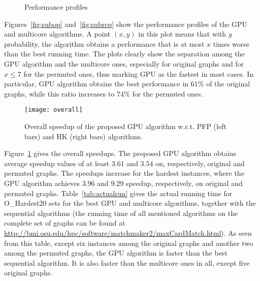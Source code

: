 \documentclass[11pt,a4paper]{article}
\newcommand{\supplementary} {\url{http://bmi.osu.edu/hpc/software/matchmaker2/maxCardMatch.html}}
\begin{document}
\begin{figure} [!htb]
\vspace*{-1em}
\caption{Performance profiles}

\end{figure}


Figures~\ref{fig:subop} and~\ref{fig:subrcp} show the performance profiles of 
the GPU and multicore algorithms. A point $(x,y)$ in this plot means that with $y$ probability, 
the algorithm obtains a performance that is at most $x$ times worse than the best 
running time. The plots clearly show the separation among the GPU algorithm and the multicore ones, especially for original graphs and for $x\leq 7$ for the permuted ones, thus marking GPU as the fastest in most cases.
In particular, GPU algorithm obtains the 
best performance in $61 \%$ of the original graphs, while this ratio increases to $74\%$ for the permuted 
ones. 



\begin{figure} [!htb]
\center
\texttt{[image: overall]}
\vspace*{-2ex}
\caption{Overall speedup of the proposed GPU algorithm w.r.t. PFP (left bars) and HK (right bars) algorithms. 
}

 \label{fig:overallspeedup}
\end{figure}


Figure~\ref{fig:overallspeedup} gives the overall speedups. The proposed GPU
algorithm obtains average speedup values of at least $3.61$ and $3.54$ on, respectively, original and permuted graphs.
The speedups increase for the hardest instances, where the GPU algorithm achieves $3.96$ and $9.29$ speedup, respectively, on original and permuted graphs. Table~\ref{tab:actualrun}
gives the actual running time for O\_Hardest20 sets for the best GPU and multicore algorithms, 
together with the sequential algorithms (the running time of all mentioned algorithms on 
the complete set of graphs can be found at \supplementary).
As seen from this table, except six instances among the original graphs and another two among the permuted graphs, the GPU algorithm is faster than the best sequential algorithm. It is also faster than the multicore ones in all, except five original graphs. 
\end{document}
